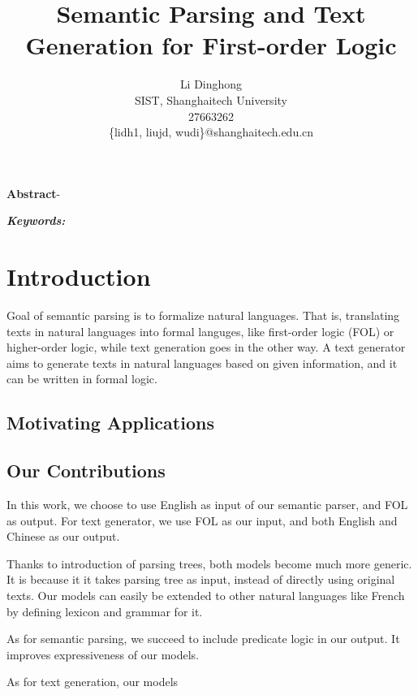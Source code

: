 \documentclass{article}
\title{Semantic Parsing and Text Generation for First-order Logic}
\author{
	Li Dinghong\\
	SIST, Shanghaitech University\\
	27663262\\
	\{lidh1, liujd, wudi\}@shanghaitech.edu.cn
}
\begin{document}
{
	\newpage
	\maketitle

	\textbf{Abstract}-{}

	\vspace{5pt}
	\textbf{\emph{Keywords:}} {}

	\tableofcontents
}

\section{Introduction}{
	Goal of semantic parsing is to formalize natural languages. That is, translating texts in natural languages into formal languges, like first-order logic (FOL) or higher-order logic, while text generation goes in the other way. A text generator aims to generate texts in natural languages based on given information, and it can be written in formal logic. 

	\subsection{Motivating Applications}{
		\cite{su} 
	}


	\subsection{Our Contributions}{
		In this work, we choose to use English as input of our semantic parser, and FOL as output. For text generator, we use FOL as our input, and both English and Chinese as our output. 


		Thanks to introduction of parsing trees, both models become much more generic. It is because it it takes parsing tree as input, instead of directly using original texts. Our models can easily be extended to other natural languages like French by defining lexicon and grammar for it. 

		As for semantic parsing, we succeed to include predicate logic in our output. It improves expressiveness of our models. 

		As for text generation, our models 
	}
}
\end{document}
